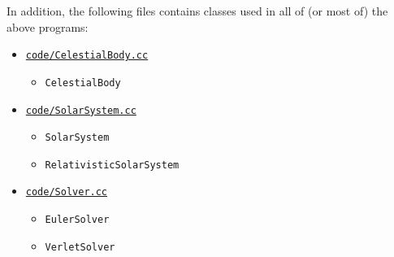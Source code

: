 \documentclass[11pt,a4paper]{article}
\begin{document}
In addition, the following files contains classes used in all of (or most of) the above programs:
\begin{itemize}
  \item \href{https://github.com/frxstrem/fys3150/tree/master/project3/code/CelestialBody.cc}{\tt code/CelestialBody.cc}
    \begin{itemize}
      \item \texttt{CelestialBody}
    \end{itemize}
  \item \href{https://github.com/frxstrem/fys3150/tree/master/project3/code/SolarSystem.cc}{\tt code/SolarSystem.cc}
    \begin{itemize}
      \item \texttt{SolarSystem}
      \item \texttt{RelativisticSolarSystem}
    \end{itemize}
  \item \href{https://github.com/frxstrem/fys3150/tree/master/project3/code/Solver.cc}{\tt code/Solver.cc}
    \begin{itemize}
      \item \texttt{EulerSolver}
      \item \texttt{VerletSolver}
    \end{itemize}
\end{itemize}

\end{document}
